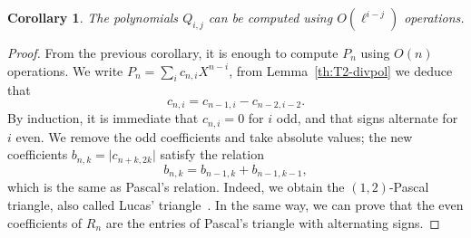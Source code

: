 \documentclass{sig-alternate}
\newtheorem{corollary}[definition]{Corollary}
\begin{document}
\begin{corollary}
  The polynomials $Q_{i,j}$ can be computed using $O(\ell^{i-j})$
  operations.
\end{corollary}
\begin{proof}
  From the previous corollary, it is enough to compute $P_n$ using
  $O(n)$ operations. We write $P_n = \sum_i c_{n,i}X^{n-i}$, from
  Lemma~\ref{th:T2-divpol} we deduce that
  \begin{equation}
    c_{n,i} = c_{n-1,i} - c_{n-2,i-2}.
  \end{equation}
  By induction, it is immediate that $c_{n,i}=0$ for $i$ odd, and that
  signs alternate for $i$ even. We remove the odd coefficients and
  take absolute values; the new coefficients $b_{n,k}=\lvert
  c_{n+k,2k}\rvert$ satisfy the relation
  \begin{equation*}
    b_{n,k} = b_{n-1,k} + b_{n-1,k-1},
  \end{equation*}
  which is the same as Pascal's relation. Indeed, we obtain the
  $(1,2)$-Pascal triangle, also called Lucas'
  triangle~\cite{benjamin10}.
  In the same way, we can prove that the even coefficients of $R_n$
  are the entries of Pascal's triangle with alternating signs.
  

\end{proof}
\end{document}
